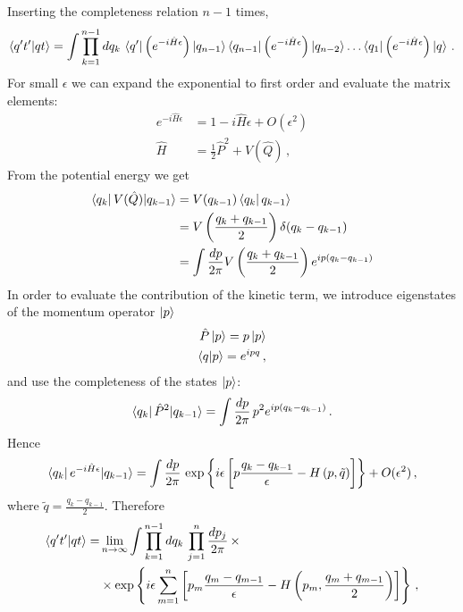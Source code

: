 \documentclass[notes]{subfiles}
\begin{document}
Inserting the completeness relation $n-1$ times,
\begin{align}
  \label{eq:AmplitudeStepOne}
  \braket{q't'}{qt} = \int \prod_{k=1}^{n-1}dq_k\,
  \bra{ q'} \left(e^{-i \hat{H} \epsilon}\right) |q_{n-1}\rangle
  \bra{ q_{n-1}} \left(e^{-i \hat{H} \epsilon}\right) |
  q_{n-2}\rangle \ldots \bra{ q_1} \left(e^{-i \hat{H}
  \epsilon}\right) \ket{q}\, .
\end{align}
For small $\epsilon$ we can expand the exponential to first order and
evaluate the matrix elements:
\begin{align}
  e^{-i \hat{H} \epsilon} &= 1 - i \hat{H} \epsilon + O(\epsilon^2)\\
\hat{H} &= \frac12 \hat{P}^2 + V(\hat{Q})\, ,
\end{align}
From the potential energy we get
\begin{align}
  \bra{ q_k} V(\hat{Q}) | q_{k-1}\rangle &= V(q_{k-1}) \bra{ q_k
                                             } q_{k-1} \rangle \\
                                            &= V\left(\frac{q_k +
                                              q_{k-1}}{2}\right)
                                              \delta(q_k-q_{k-1}) \\
                                            & = \int \frac{dp}{2\pi} V\left(\frac{q_k +
                                              q_{k-1}}{2}\right) 
                                              e^{ip (q_k-q_{k-1})}
\end{align}
In order to evaluate the contribution of the kinetic term, we
introduce eigenstates of the momentum operator $\ket{p}$
\begin{align}
  \hat{P} \ket{p} = p \ket{p} \\
  \braket{q}{p} = e^{ipq}\, ,
\end{align}
and use the completeness of the states $\ket{p}$:
\begin{align}
  \bra{ q_k} \hat{P}^2 | q_{k-1}\rangle = 
  \int \frac{dp}{2\pi}\, p^2 e^{ip(q_k-q_{k-1})}\, .
\end{align}
Hence
\begin{align}
  \bra{ q_k} e^{-i\hat{H}\epsilon} | q_{k-1}\rangle = 
  \int \frac{dp}{2\pi}\, \exp\left\{i\epsilon \left[
  p \frac{q_k-q_{k-1}}{\epsilon} - H\left(p,\tilde{q}\right)
  \right]
  \right\} + O(\epsilon^2)\, ,
\end{align}
where $\tilde{q}=\frac{q_k-q_{k-1}}{2}$. Therefore
\begin{align}
  \braket{q't'}{qt} =& \lim_{n\to\infty} \int \prod_{k=1}^{n-1}dq_k\, 
  \prod_{j=1}^{n} \frac{dp_j}{2\pi}\, \times \\
  &\times \exp \left\{
    i\epsilon \sum_{m=1}^{n} \left[
    p_m \frac{q_m-q_{m-1}}{\epsilon} - H\left(p_m, 
    \frac{q_m+q_{m-1}}{2}\right)
    \right]
    \right\}\, ,
\end{align}
\end{document}
